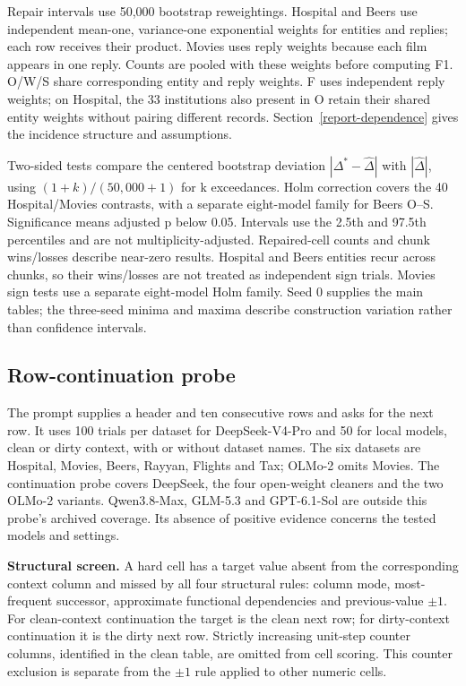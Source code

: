 \documentclass[10pt,a4paper]{article}
\begin{document}
Repair intervals use 50,000 bootstrap reweightings. Hospital and Beers use independent
mean-one, variance-one exponential weights for entities and replies; each row receives their
product. Movies uses reply weights because each film appears in one reply. Counts are pooled
with these weights before computing F1. O/W/S share corresponding entity and reply weights.
F uses independent reply weights; on Hospital, the 33 institutions also present in O retain
their shared entity weights without pairing different records. Section~\ref{report-dependence}
gives the incidence structure and assumptions.

Two-sided tests compare the centered bootstrap deviation
\( |\Delta^*-\widehat\Delta| \) with \( |\widehat\Delta| \), using \((1+k)/(50{,}000+1)\)
for k exceedances. Holm correction covers the 40 Hospital/Movies contrasts, with a separate
eight-model family for Beers O--S. Significance means adjusted p below 0.05.
Intervals use the 2.5th and 97.5th percentiles and are not multiplicity-adjusted.
Repaired-cell counts and chunk wins/losses describe near-zero results. Hospital and Beers
entities recur across chunks, so their wins/losses are not treated as independent sign trials.
Movies sign tests use a separate eight-model Holm family.
Seed 0 supplies the main tables; the three-seed minima and maxima describe construction
variation rather than confidence intervals.

\subsection{Row-continuation probe}

The prompt supplies a header and ten consecutive rows and asks for the next row. It uses 100 trials per dataset for DeepSeek-V4-Pro and 50 for local models, clean or dirty context, with or without dataset names. The six datasets are Hospital, Movies, Beers, Rayyan, Flights and Tax; OLMo-2 omits Movies. The continuation probe covers DeepSeek, the four open-weight cleaners and the two OLMo-2 variants. Qwen3.8-Max, GLM-5.3 and GPT-6.1-Sol are outside this probe's archived coverage. Its absence of positive evidence concerns the tested models and settings.

\textbf{Structural screen.} A hard cell has a target value absent from the corresponding context column and missed by all four structural rules: column mode, most-frequent successor, approximate functional dependencies and previous-value $\pm1$. For clean-context continuation the target is the clean next row; for dirty-context continuation it is the dirty next row. Strictly increasing unit-step counter columns, identified in the clean table, are omitted from cell scoring. This counter exclusion is separate from the $\pm1$ rule applied to other numeric cells.
\end{document}
